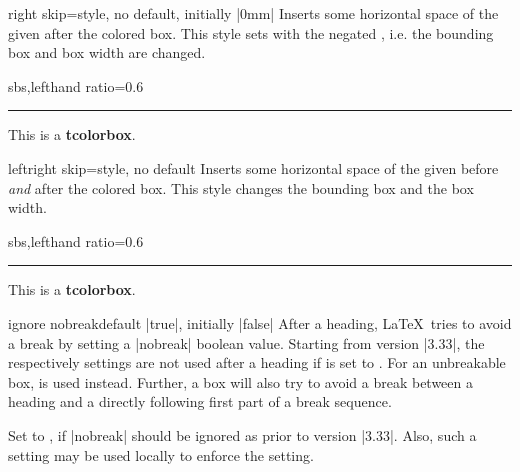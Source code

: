 \begin{docTcbKey}[][doc new=2014-11-07]{right skip}{=}{style, no default, initially |0mm|}
  Inserts some horizontal space of the given  after the colored box.
  This style sets  with the negated ,
  i.e. the bounding box and box width are changed.
\begin{dispExample*}{sbs,lefthand ratio=0.6}
\noindent\rule{\linewidth}{2pt}

\begin{tcolorbox}[right skip=1cm,
    colframe=red!50!white]
  This is a \textbf{tcolorbox}.
\end{tcolorbox}
\end{dispExample*}
\end{docTcbKey}

\begin{docTcbKey}[][doc new=2014-10-10]{leftright skip}{=}{style, no default}
  Inserts some horizontal space of the given  before \emph{and} after the colored box.
  This style changes the bounding box and the box width.
\begin{dispExample*}{sbs,lefthand ratio=0.6}
\noindent\rule{\linewidth}{2pt}

\begin{tcolorbox}[leftright skip=1cm,
    colframe=red!50!white]
  This is a \textbf{tcolorbox}.
\end{tcolorbox}
\end{dispExample*}
\end{docTcbKey}


\begin{docTcbKey}[][doc new=2014-12-11]{ignore nobreak}{}{default |true|, initially |false|}
After a heading, \LaTeX\ tries to avoid a break by setting a |nobreak| boolean value.
Starting from version |3.33|, the  respectively 
settings are not used after a heading if  is
set to . For an unbreakable box,  is used instead.
Further, a  box will also try to
avoid a break between a heading and a directly following first part of a
break sequence.

Set  to , if |nobreak| should be
ignored as prior to version |3.33|. Also, such a setting may be used locally to
enforce the  setting.
\end{docTcbKey}

